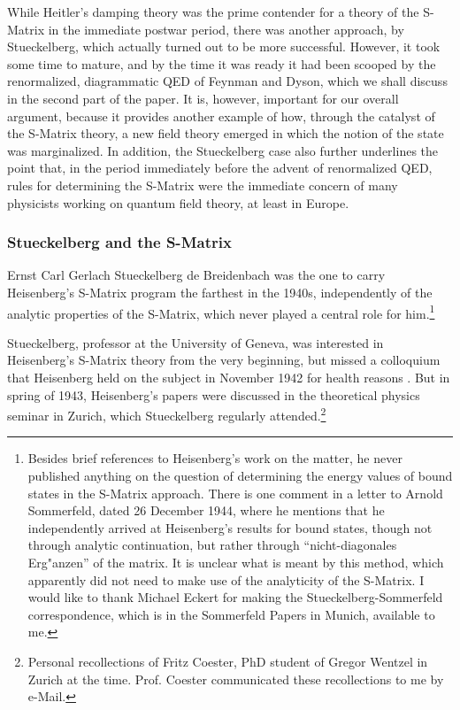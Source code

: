 \documentclass[12pt]{article}
\begin{document}
While Heitler's damping theory was the prime contender for a theory of the S-Matrix in the immediate postwar period, there was another approach, by Stueckelberg, which actually turned out to be more successful. However, it took some time to mature, and by the time it was ready it had been scooped by the renormalized, diagrammatic QED of Feynman and Dyson, which we shall discuss in the second part of the paper. It is, however, important for our overall argument, because it provides another example of how, through the catalyst of the S-Matrix theory, a new field theory emerged in which the notion of the state was marginalized. In addition, the Stueckelberg case also further underlines the point that, in the period immediately before the advent of renormalized QED, rules for determining the S-Matrix were the immediate concern of many physicists working on quantum field theory, at least in Europe.

\subsubsection{Stueckelberg and the S-Matrix}

Ernst Carl Gerlach Stueckelberg de Breidenbach was the one to carry Heisenberg's S-Matrix program the farthest in the 1940s, independently of the analytic properties of the S-Matrix, which never played a central role for him.\footnote{Besides brief references to Heisenberg's work on the matter, he never published anything on the question of determining the energy values of bound states in the S-Matrix approach. There is one comment in a letter to Arnold Sommerfeld, dated 26 December 1944, where he mentions that he independently arrived at Heisenberg's results for bound states, though not through analytic continuation, but rather through ``nicht-diagonales Erg"anzen'' of the matrix. It is unclear what is meant by this method, which apparently did not need to make use of the analyticity of the S-Matrix. I would like to thank Michael Eckert for making the Stueckelberg-Sommerfeld correspondence, which is in the Sommerfeld Papers in Munich, available to me.} 

Stueckelberg, professor at the University of Geneva, was interested in Heisenberg's S-Matrix theory from the very beginning, but missed a colloquium that Heisenberg held on the subject in November 1942 for health reasons \citep[p. 555-556]{rechenberg_1989_the-early}. But in spring of 1943, Heisenberg's papers were discussed in the theoretical physics seminar in Zurich, which Stueckelberg regularly attended.\footnote{Personal recollections of Fritz Coester, PhD student of Gregor Wentzel in Zurich at the time. Prof. Coester communicated these recollections to me by e-Mail.}
\end{document}

